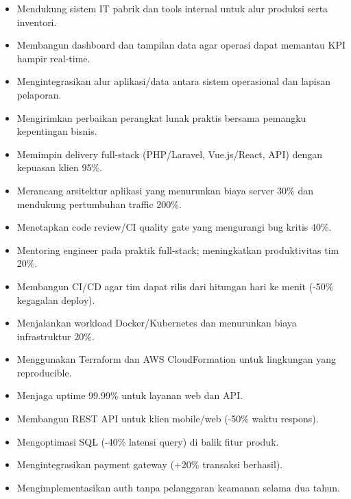 \begin{itemize}
  \item Mendukung sistem IT pabrik dan tools internal untuk alur produksi serta inventori.
  \item Membangun dashboard dan tampilan data agar operasi dapat memantau KPI hampir real-time.
  \item Mengintegrasikan alur aplikasi/data antara sistem operasional dan lapisan pelaporan.
  \item Mengirimkan perbaikan perangkat lunak praktis bersama pemangku kepentingan bisnis.
\end{itemize}
\vspace{4pt}
\begin{itemize}
  \item Memimpin delivery full-stack (PHP/Laravel, Vue.js/React, API) dengan kepuasan klien 95\%.
  \item Merancang arsitektur aplikasi yang menurunkan biaya server 30\% dan mendukung pertumbuhan traffic 200\%.
  \item Menetapkan code review/CI quality gate yang mengurangi bug kritis 40\%.
  \item Mentoring engineer pada praktik full-stack; meningkatkan produktivitas tim 20\%.
\end{itemize}
\vspace{4pt}
\begin{itemize}
  \item Membangun CI/CD agar tim dapat rilis dari hitungan hari ke menit (-50\% kegagalan deploy).
  \item Menjalankan workload Docker/Kubernetes dan menurunkan biaya infrastruktur 20\%.
  \item Menggunakan Terraform dan AWS CloudFormation untuk lingkungan yang reproducible.
  \item Menjaga uptime 99.99\% untuk layanan web dan API.
\end{itemize}
\vspace{4pt}
\begin{itemize}
  \item Membangun REST API untuk klien mobile/web (-50\% waktu respons).
  \item Mengoptimasi SQL (-40\% latensi query) di balik fitur produk.
  \item Mengintegrasikan payment gateway (+20\% transaksi berhasil).
  \item Mengimplementasikan auth tanpa pelanggaran keamanan selama dua tahun.
\end{itemize}
